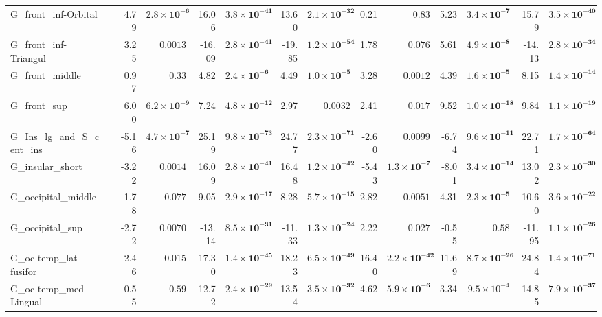 {\begin{longtable}{llrrrrrrrrrrrr}
G\_front\_inf-Orbital &  & 4.79 & $\mathbf{2.8{\times}10^{-6}}$ & 16.06 & $\mathbf{3.8{\times}10^{-41}}$ & 13.60 & $\mathbf{2.1{\times}10^{-32}}$ & 0.21 & $0.83$ & 5.23 & $\mathbf{3.4{\times}10^{-7}}$ & 15.79 & $\mathbf{3.5{\times}10^{-40}}$ \\
G\_front\_inf-Triangul &  & 3.25 & $0.0013$ & -16.09 & $\mathbf{2.8{\times}10^{-41}}$ & -19.85 & $\mathbf{1.2{\times}10^{-54}}$ & 1.78 & $0.076$ & 5.61 & $\mathbf{4.9{\times}10^{-8}}$ & -14.13 & $\mathbf{2.8{\times}10^{-34}}$ \\
G\_front\_middle &  & 0.97 & $0.33$ & 4.82 & $\mathbf{2.4{\times}10^{-6}}$ & 4.49 & $\mathbf{1.0{\times}10^{-5}}$ & 3.28 & $0.0012$ & 4.39 & $\mathbf{1.6{\times}10^{-5}}$ & 8.15 & $\mathbf{1.4{\times}10^{-14}}$ \\
G\_front\_sup &  & 6.00 & $\mathbf{6.2{\times}10^{-9}}$ & 7.24 & $\mathbf{4.8{\times}10^{-12}}$ & 2.97 & $0.0032$ & 2.41 & $0.017$ & 9.52 & $\mathbf{1.0{\times}10^{-18}}$ & 9.84 & $\mathbf{1.1{\times}10^{-19}}$ \\
G\_Ins\_lg\_and\_S\_cent\_ins &  & -5.16 & $\mathbf{4.7{\times}10^{-7}}$ & 25.19 & $\mathbf{9.8{\times}10^{-73}}$ & 24.77 & $\mathbf{2.3{\times}10^{-71}}$ & -2.60 & $0.0099$ & -6.74 & $\mathbf{9.6{\times}10^{-11}}$ & 22.71 & $\mathbf{1.7{\times}10^{-64}}$ \\
G\_insular\_short &  & -3.22 & $0.0014$ & 16.09 & $\mathbf{2.8{\times}10^{-41}}$ & 16.48 & $\mathbf{1.2{\times}10^{-42}}$ & -5.43 & $\mathbf{1.3{\times}10^{-7}}$ & -8.01 & $\mathbf{3.4{\times}10^{-14}}$ & 13.02 & $\mathbf{2.3{\times}10^{-30}}$ \\
G\_occipital\_middle &  & 1.78 & $0.077$ & 9.05 & $\mathbf{2.9{\times}10^{-17}}$ & 8.28 & $\mathbf{5.7{\times}10^{-15}}$ & 2.82 & $0.0051$ & 4.31 & $\mathbf{2.3{\times}10^{-5}}$ & 10.60 & $\mathbf{3.6{\times}10^{-22}}$ \\
G\_occipital\_sup &  & -2.72 & $0.0070$ & -13.14 & $\mathbf{8.5{\times}10^{-31}}$ & -11.33 & $\mathbf{1.3{\times}10^{-24}}$ & 2.22 & $0.027$ & -0.55 & $0.58$ & -11.95 & $\mathbf{1.1{\times}10^{-26}}$ \\
G\_oc-temp\_lat-fusifor &  & -2.46 & $0.015$ & 17.30 & $\mathbf{1.4{\times}10^{-45}}$ & 18.23 & $\mathbf{6.5{\times}10^{-49}}$ & 16.40 & $\mathbf{2.2{\times}10^{-42}}$ & 11.69 & $\mathbf{8.7{\times}10^{-26}}$ & 24.84 & $\mathbf{1.4{\times}10^{-71}}$ \\
G\_oc-temp\_med-Lingual &  & -0.55 & $0.59$ & 12.72 & $\mathbf{2.4{\times}10^{-29}}$ & 13.54 & $\mathbf{3.5{\times}10^{-32}}$ & 4.62 & $\mathbf{5.9{\times}10^{-6}}$ & 3.34 & $9.5{\times}10^{-4}$ & 14.85 & $\mathbf{7.9{\times}10^{-37}}$ \\

\end{longtable}}

